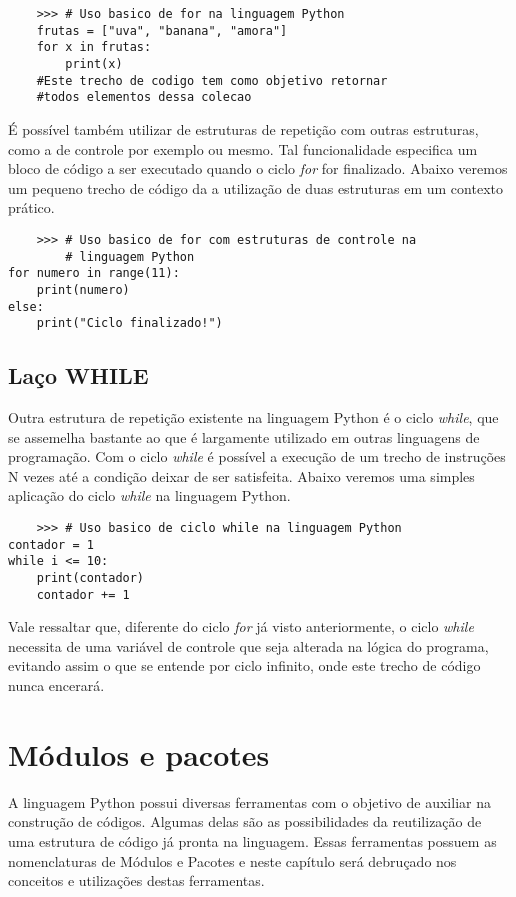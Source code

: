 \begin{lstlisting}
	>>> # Uso basico de for na linguagem Python
	frutas = ["uva", "banana", "amora"]
	for x in frutas:
		print(x)
	#Este trecho de codigo tem como objetivo retornar 
	#todos elementos dessa colecao	
\end{lstlisting}  
É possível também utilizar de estruturas de repetição com outras estruturas, como a de controle por exemplo ou mesmo. Tal funcionalidade especifica um bloco de código a ser executado quando o ciclo \textit{for} for finalizado. Abaixo veremos um pequeno trecho de código da a utilização de duas estruturas em um contexto prático. 
\begin{lstlisting}
	>>> # Uso basico de for com estruturas de controle na 
	    # linguagem Python
for numero in range(11):
	print(numero)
else:
	print("Ciclo finalizado!")	
\end{lstlisting} 
            \subsection{La\c{c}o WHILE}
Outra estrutura de repetição existente na linguagem Python é o ciclo \textit{while}, que se assemelha bastante ao que é largamente utilizado em outras linguagens de programação. Com o ciclo \textit{while} é possível a execução de um trecho de instruções N vezes até a condição deixar de ser satisfeita. Abaixo veremos uma simples aplicação do ciclo \textit{while} na linguagem Python.  

\begin{lstlisting}
	>>> # Uso basico de ciclo while na linguagem Python
contador = 1
while i <= 10:
	print(contador)
	contador += 1	
\end{lstlisting} 
Vale ressaltar que, diferente do ciclo \textit{for} já visto anteriormente, o ciclo \textit{while} necessita de uma variável de controle que seja alterada na lógica do programa, evitando assim o que se entende por ciclo infinito, onde este trecho de código nunca encerará. 

    \section{M\'{o}dulos e pacotes}
A linguagem Python possui diversas ferramentas com o objetivo de auxiliar na construção de códigos. Algumas delas são as possibilidades da reutilização de uma estrutura de código já pronta na linguagem. Essas ferramentas possuem as nomenclaturas de Módulos e Pacotes e  neste capítulo será debruçado nos conceitos e utilizações destas ferramentas.  
